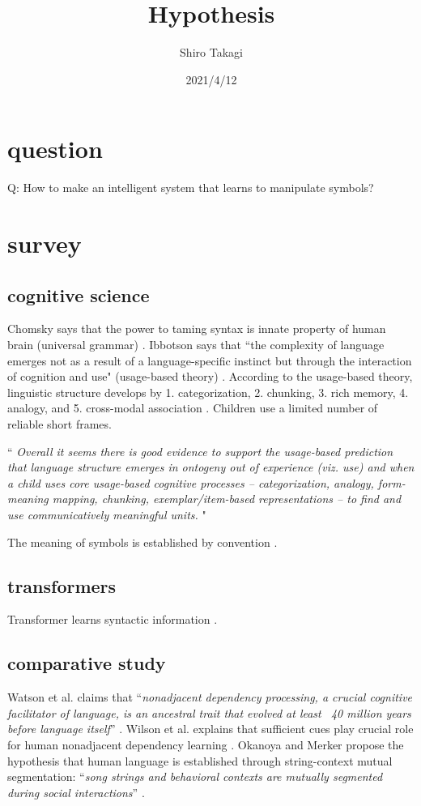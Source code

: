 \documentclass[12pt]{article}
\begin{document}
\title{Hypothesis}
\author{Shiro Takagi}
\date{2021/4/12}
\maketitle

\section{question}
Q: How to make an intelligent system that learns to manipulate symbols?

\section{survey}

\subsection{cognitive science}
Chomsky says that the power to taming syntax is innate property of 
human brain (universal grammar) \cite{Chomsky02}. 
Ibbotson says that ``the complexity of language emerges 
not as a result of a language-specific instinct 
but through the interaction of cognition and use" (usage-based theory) 
\cite{Ibbotson13}. According to the usage-based theory, linguistic 
structure develops by 1. categorization, 2. chunking, 3. rich memory, 
4. analogy, and 5. cross-modal association \cite{Bybee10,Ibbotson13}.
Children use a limited number of reliable short frames.


``
\textit{Overall it seems there is good evidence to support the usage-based 
prediction that language structure emerges in ontogeny out of 
experience (viz. use) and when a child uses core usage-based cognitive 
processes – categorization, analogy, form-meaning mapping, chunking, 
exemplar/item-based representations – to find and use communicatively 
meaningful units.} \cite{Ibbotson13}
"

The meaning of symbols is established by convention \cite{Santoro21,Taniguchi18,Mcclelland20}. 


\subsection{transformers}
Transformer learns syntactic information \cite{Reif19,Hewitt19,Goldberg19,Tenney19}.

\subsection{comparative study}
Watson et al. claims that ``\textit{nonadjacent dependency processing, a crucial cognitive facilitator 
of language, is an ancestral trait that evolved at least ~40 million years before language itself}'' \cite{Watson20}. 
Wilson et al. explains that sufficient cues play crucial role for human nonadjacent dependency learning \cite{Wilson20}.
Okanoya and Merker propose the hypothesis that human language is established through string-context 
mutual segmentation: ``\textit{song strings and behavioral contexts are mutually segmented
during social interactions}'' \cite{Okanoya07}. 
\end{document}
